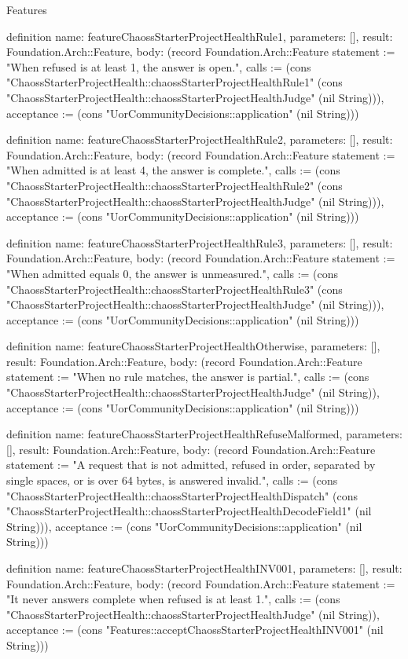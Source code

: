 \begin{lexlean}{Features}
\begin{semanticmodule}
definition{
  name: featureChaossStarterProjectHealthRule1,
  parameters: [],
  result: Foundation.Arch::Feature,
  body: (record Foundation.Arch::Feature {statement := "When refused is at least 1, the answer is open.", calls := (cons "ChaossStarterProjectHealth::chaossStarterProjectHealthRule1" (cons "ChaossStarterProjectHealth::chaossStarterProjectHealthJudge" (nil String))), acceptance := (cons "UorCommunityDecisions::application" (nil String))})
}

definition{
  name: featureChaossStarterProjectHealthRule2,
  parameters: [],
  result: Foundation.Arch::Feature,
  body: (record Foundation.Arch::Feature {statement := "When admitted is at least 4, the answer is complete.", calls := (cons "ChaossStarterProjectHealth::chaossStarterProjectHealthRule2" (cons "ChaossStarterProjectHealth::chaossStarterProjectHealthJudge" (nil String))), acceptance := (cons "UorCommunityDecisions::application" (nil String))})
}

definition{
  name: featureChaossStarterProjectHealthRule3,
  parameters: [],
  result: Foundation.Arch::Feature,
  body: (record Foundation.Arch::Feature {statement := "When admitted equals 0, the answer is unmeasured.", calls := (cons "ChaossStarterProjectHealth::chaossStarterProjectHealthRule3" (cons "ChaossStarterProjectHealth::chaossStarterProjectHealthJudge" (nil String))), acceptance := (cons "UorCommunityDecisions::application" (nil String))})
}

definition{
  name: featureChaossStarterProjectHealthOtherwise,
  parameters: [],
  result: Foundation.Arch::Feature,
  body: (record Foundation.Arch::Feature {statement := "When no rule matches, the answer is partial.", calls := (cons "ChaossStarterProjectHealth::chaossStarterProjectHealthJudge" (nil String)), acceptance := (cons "UorCommunityDecisions::application" (nil String))})
}

definition{
  name: featureChaossStarterProjectHealthRefuseMalformed,
  parameters: [],
  result: Foundation.Arch::Feature,
  body: (record Foundation.Arch::Feature {statement := "A request that is not admitted, refused in order, separated by single spaces, or is over 64 bytes, is answered invalid.", calls := (cons "ChaossStarterProjectHealth::chaossStarterProjectHealthDispatch" (cons "ChaossStarterProjectHealth::chaossStarterProjectHealthDecodeField1" (nil String))), acceptance := (cons "UorCommunityDecisions::application" (nil String))})
}

definition{
  name: featureChaossStarterProjectHealthINV001,
  parameters: [],
  result: Foundation.Arch::Feature,
  body: (record Foundation.Arch::Feature {statement := "It never answers complete when refused is at least 1.", calls := (cons "ChaossStarterProjectHealth::chaossStarterProjectHealthJudge" (nil String)), acceptance := (cons "Features::acceptChaossStarterProjectHealthINV001" (nil String))})
}


\end{semanticmodule}
\end{lexlean}
